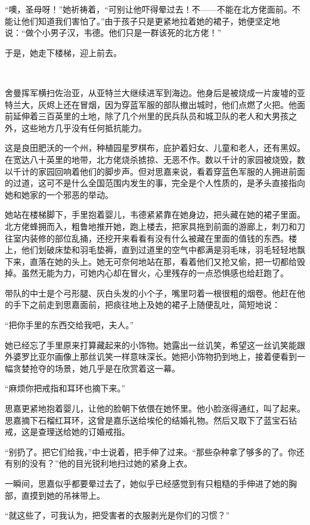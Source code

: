 \par “噢，圣母呀！”她祈祷着，“可别让他吓得晕过去！不——不能在北方佬面前。不能让他们知道我们害怕了。”由于孩子只是更紧地拉着她的裙子，她便坚定地说：“做个小男子汉，韦德。他们只是一群该死的北方佬！”
\par 于是，她走下楼梯，迎上前去。
\par  
\par 舍曼挥军横扫佐治亚，从亚特兰大继续进军到海边。他身后是被烧成一片废墟的亚特兰大，灰烬上还在冒烟，因为穿蓝军服的部队撤出城时，他们点燃了火把。他面前延伸着三百英里的土地，除了几个州里的民兵队员和城卫队的老人和大男孩之外，这些地方几乎没有任何抵抗能力。
\par 这是良田肥沃的一个州，种植园星罗棋布，庇护着妇女、儿童和老人，还有黑奴。在宽达八十英里的地带，北方佬烧杀掳掠、无恶不作。数以千计的家园被烧毁，数以千计的家园回响着他们的脚步声。但对思嘉来说，看着穿蓝色军服的人拥进前面的过道，这可不是什么全国范围内发生的事，完全是个人性质的，是矛头直接指向她和她家的一个邪恶的举动。
\par 她站在楼梯脚下，手里抱着婴儿，韦德紧紧靠在她身边，把头藏在她的裙子里面。北方佬蜂拥而入，粗鲁地推开她，跑上楼去，把家具拖到前面的游廊上，刺刀和刀往室内装修的部位乱捅，还挖开来看看有没有什么被藏在里面的值钱的东西。楼上，他们划破床垫和羽毛垫褥，直到过道里的空气中都满是羽毛味，羽毛轻轻地飘下来，直落在她的头上。她无可奈何地站在那，看着他们又抢又偷，把一切都给毁掉。虽然无能为力，可她内心却在冒火，心里残存的一点恐惧感也给赶跑了。
\par 带队的中士是个弓形腿、灰白头发的小个子，嘴里叼着一根很粗的烟卷。他赶在他的手下之前走到思嘉面前，把痰往地上及她的裙子上随便乱吐，简短地说：
\par “把你手里的东西交给我吧，夫人。”
\par 她已经忘了手里原来打算藏起来的小饰物。她露出一丝讥笑，希望这一丝讥笑能跟外婆罗比亚尔画像上那丝讥笑一样意味深长。她把小饰物扔到地上，接着便看到一幅贪婪抢夺的场景，她几乎是在欣赏着这一幕。
\par “麻烦你把戒指和耳环也摘下来。”
\par 思嘉更紧地抱着婴儿，让他的脸朝下依偎在她怀里。他小脸涨得通红，叫了起来。思嘉摘下石榴红耳环，这曾是嘉乐送给埃伦的结婚礼物。然后又取下了蓝宝石钻戒，这是查理送给她的订婚戒指。
\par “别扔了。把它们给我，”中士说着，把手伸了过来。“那些杂种拿了够多的了。你还有别的没有？”他的目光锐利地扫过她的紧身上衣。
\par 一瞬间，思嘉似乎都要晕过去了，她似乎已经感觉到有只粗糙的手伸进了她的胸部，直摸到她的吊袜带上。
\par “就这些了，可我认为，把受害者的衣服剥光是你们的习惯？”
